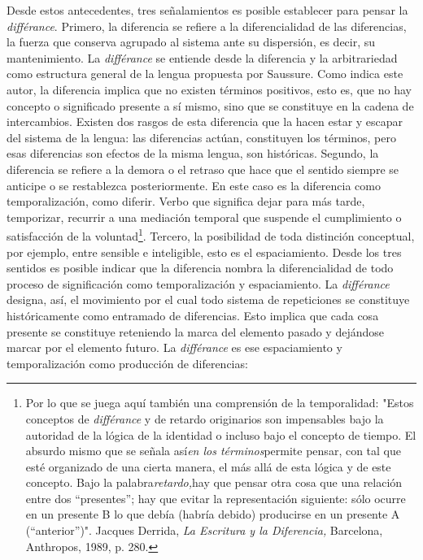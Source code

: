 \documentclass{book}
\begin{document}
Desde estos antecedentes, tres señalamientos es posible establecer para
pensar la \emph{différance}. Primero, la diferencia se refiere a la
diferencialidad de las diferencias, la fuerza que conserva agrupado al
sistema ante su dispersión, es decir, su mantenimiento. La
\emph{différance} se entiende desde la diferencia y la arbitrariedad
como estructura general de la lengua propuesta por Saussure. Como indica
este autor, la diferencia implica que no existen términos positivos,
esto es, que no hay concepto o significado presente a sí mismo, sino que
se constituye en la cadena de intercambios. Existen dos rasgos de esta
diferencia que la hacen estar y escapar del sistema de la lengua: las
diferencias actúan, constituyen los términos, pero esas diferencias son
efectos de la misma lengua, son históricas. Segundo, la diferencia se
refiere a la demora o el retraso que hace que el sentido siempre se
anticipe o se restablezca posteriormente. En este caso es la diferencia
como temporalización, como diferir. Verbo que significa dejar para más
tarde, temporizar, recurrir a una mediación temporal que suspende el
cumplimiento o satisfacción de la voluntad\footnote{Por lo que se juega
  aquí también una comprensión de la temporalidad: "Estos conceptos de
  \emph{différance} y de retardo originarios son impensables bajo la
  autoridad de la lógica de la identidad o incluso bajo el concepto de
  tiempo. El absurdo mismo que se señala así\emph{en los
  términos}permite pensar, con tal que esté organizado de una cierta
  manera, el más allá de esta lógica y de este concepto. Bajo la
  palabra\emph{retardo,}hay que pensar otra cosa que una relación entre
  dos ``presentes''; hay que evitar la representación siguiente: sólo
  ocurre en un presente B lo que debía (habría debido) producirse en un
  presente A (``anterior'')". Jacques Derrida, \emph{La Escritura y la
  Diferencia,} Barcelona, Anthropos, 1989, p. 280.}. Tercero, la
posibilidad de toda distinción conceptual, por ejemplo, entre sensible e
inteligible, esto es el espaciamiento. Desde los tres sentidos es
posible indicar que la diferencia nombra la diferencialidad de todo
proceso de significación como temporalización y espaciamiento. La
\emph{différance} designa, así, el movimiento por el cual todo sistema
de repeticiones se constituye históricamente como entramado de
diferencias. Esto implica que cada cosa presente se constituye
reteniendo la marca del elemento pasado y dejándose marcar por el
elemento futuro. La \emph{différance} es ese espaciamiento y
temporalización como producción de diferencias:
\end{document}
